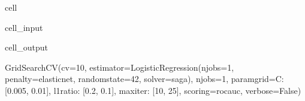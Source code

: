 \documentclass[letterpaper,10pt,english]{jupyterBook}
\begin{document}
\begin{sphinxuseclass}{cell}
\begin{sphinxVerbatimInput}
\begin{sphinxuseclass}{cell_input}
\end{sphinxuseclass}\end{sphinxVerbatimInput}
\begin{sphinxVerbatimOutput}

\begin{sphinxuseclass}{cell_output}
\begin{sphinxVerbatim}[commandchars=\\\{\}]
GridSearchCV(cv=10,
             estimator=LogisticRegression(n\PYGZus{}jobs=\PYGZhy{}1, penalty=\PYGZsq{}elasticnet\PYGZsq{},
                                          random\PYGZus{}state=42, solver=\PYGZsq{}saga\PYGZsq{}),
             n\PYGZus{}jobs=\PYGZhy{}1,
             param\PYGZus{}grid=\PYGZob{}\PYGZsq{}C\PYGZsq{}: [0.005, 0.01], \PYGZsq{}l1\PYGZus{}ratio\PYGZsq{}: [0.2, 0.1],
                         \PYGZsq{}max\PYGZus{}iter\PYGZsq{}: [10, 25]\PYGZcb{},
             scoring=\PYGZsq{}roc\PYGZus{}auc\PYGZsq{}, verbose=False)
\end{sphinxVerbatim}

\end{sphinxuseclass}\end{sphinxVerbatimOutput}

\end{sphinxuseclass}
\end{document}
